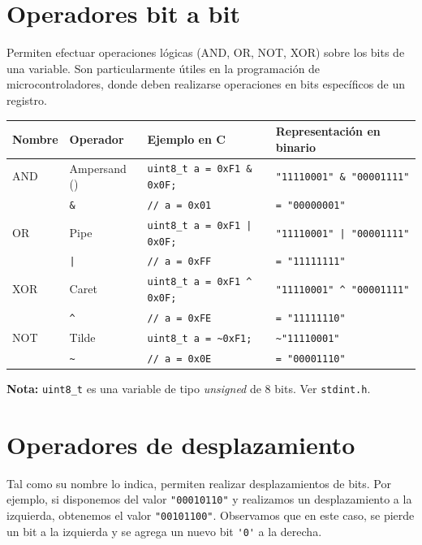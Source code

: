 \documentclass[paper=a4, fontsize=11pt]{scrartcl}	%
\numberwithin{equation}{section} %
\numberwithin{figure}{section} %
\numberwithin{table}{section} %
\begin{document}
\section{Operadores bit a bit}

Permiten efectuar operaciones lógicas (AND, OR, NOT, XOR) sobre los bits
de una variable. Son particularmente útiles en la programación de
microcontroladores, donde deben realizarse operaciones en bits
específicos de un registro.

\begin{table}[h]
  \centering
  \small
  \begin{tabular}{l | l | l | l}
    \hline
    \textbf{Nombre} & \textbf{Operador} & \textbf{Ejemplo en C} & \textbf{Representación en binario} \\ \hline
    AND & Ampersand () & \verb!uint8_t a = 0xF1 & 0x0F;! & \verb!"11110001" & "00001111"! \\
    & \verb!&! & \verb!// a = 0x01! & \verb!= "00000001"! \\ \hline
    OR & Pipe & \verb!uint8_t a = 0xF1 | 0x0F;! & \verb!"11110001" | "00001111"!  \\
    & \verb!|! & \verb!// a = 0xFF! & \verb!= "11111111"! \\ \hline
    XOR & Caret & \verb!uint8_t a = 0xF1 ^ 0x0F;!  & \verb!"11110001" ^ "00001111"!  \\
    & \verb!^! & \verb!// a = 0xFE! & \verb!= "11111110"! \\ \hline
    NOT  & Tilde & \verb!uint8_t a = ~0xF1;! & \verb!~"11110001"! \\
    & \verb!~! & \verb!// a = 0x0E! & \verb!= "00001110"! \\ \hline
  \end{tabular}
\end{table}
\textbf{Nota:} \verb|uint8_t| es una variable de tipo \emph{unsigned} de
8 bits. Ver \verb|stdint.h|.

\section{Operadores de desplazamiento}

Tal como su nombre lo indica, permiten realizar desplazamientos de bits.
Por ejemplo, si disponemos del valor \verb|"00010110"| y realizamos un
desplazamiento a la izquierda, obtenemos el valor \verb|"00101100"|. Observamos
que en este caso, se {pierde} un bit a la izquierda y se
{agrega} un nuevo bit \verb|'0'| a la derecha.
\end{document}
